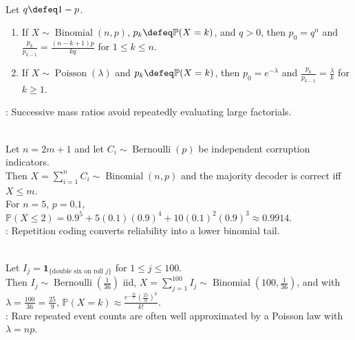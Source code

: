 \begin{method} \label{meth:recursive-binomial-poisson-masses} \\
Let $q\defeq1-p$.
\begin{enumerate}[label=(\roman*)]
\setlength{\itemsep}{0pt}
\item If $X\sim\operatorname{Binomial}(n,p)$, $p_k\defeq\mathbb{P}(X=k)$, and $q>0$, then $p_0=q^n$ and $\frac{p_k}{p_{k-1}}=\frac{(n-k+1)p}{kq}$ for $1\leq k\leq n$.
\item If $X\sim\operatorname{Poisson}(\lambda)$ and $p_k\defeq\mathbb{P}(X=k)$, then $p_0=e^{-\lambda}$ and $\frac{p_k}{p_{k-1}}=\frac{\lambda}{k}$ for $k\geq1$.
\end{enumerate}
: Successive mass ratios avoid repeatedly evaluating large factorials.
\end{method}

\begin{example} \label{ex:majority-decoder-binomial-tail} \\
Let $n=2m+1$ and let $C_i\sim\operatorname{Bernoulli}(p)$ be independent corruption indicators.\\
Then $X=\sum\limits_{i=1}^{n}C_i\sim\operatorname{Binomial}(n,p)$ and the majority decoder is correct iff $X\leq m$.\\
For $n=5$, $p=0.1$, $\mathbb{P}(X\leq2)=0.9^5+5(0.1)(0.9)^4+10(0.1)^2(0.9)^3\approx0.9914$.\\
: Repetition coding converts reliability into a lower binomial tail.
\end{example}

\begin{example} \label{ex:poisson-approximation-double-sixes} \\
Let $I_j=\mathbf{1}_{\{\text{double six on roll }j\}}$ for $1\leq j\leq100$.\\
Then $I_j\sim\operatorname{Bernoulli}(\frac{1}{36})$ iid, $X=\sum\limits_{j=1}^{100}I_j\sim\operatorname{Binomial}(100,\frac{1}{36})$, and with $\lambda=\frac{100}{36}=\frac{25}{9}$, $\mathbb{P}(X=k)\approx \frac{e^{-\frac{25}{9}}(\frac{25}{9})^k}{k!}$.\\
: Rare repeated event counts are often well approximated by a Poisson law with $\lambda=np$.
\end{example}

